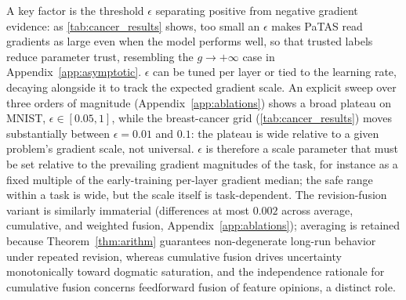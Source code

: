 A key factor is the threshold \(\epsilon\) separating positive from negative gradient evidence: as \cref{tab:cancer_results} shows, too small an \(\epsilon\) makes PaTAS read gradients as large even when the model performs well, so that trusted labels reduce parameter trust, resembling the \(g \to +\infty\) case in Appendix~\ref{app:asymptotic}. \(\epsilon\) can be tuned per layer or tied to the learning rate, decaying alongside it to track the expected gradient scale. An explicit sweep over three orders of magnitude (Appendix~\ref{app:ablations}) shows a broad plateau on MNIST, $\epsilon \in [0.05, 1]$, while the breast-cancer grid (\cref{tab:cancer_results}) moves substantially between $\epsilon = 0.01$ and $0.1$: the plateau is wide relative to a given problem's gradient scale, not universal. $\epsilon$ is therefore a scale parameter that must be set relative to the prevailing gradient magnitudes of the task, for instance as a fixed multiple of the early-training per-layer gradient median; the safe range within a task is wide, but the scale itself is task-dependent. The revision-fusion variant is similarly immaterial (differences at most $0.002$ across average, cumulative, and weighted fusion, Appendix~\ref{app:ablations}); averaging is retained because Theorem~\ref{thm:arithm} guarantees non-degenerate long-run behavior under repeated revision, whereas cumulative fusion drives uncertainty monotonically toward dogmatic saturation, and the independence rationale for cumulative fusion concerns feedforward fusion of feature opinions, a distinct role.

